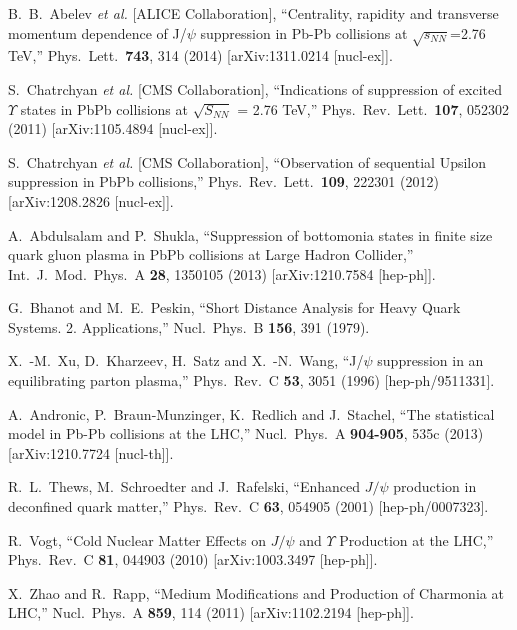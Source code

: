 \documentclass[aps,prc,preprint,superscriptaddress,showpacs,showkeys]{revtex4-1}
\begin{document}
\begin{thebibliography}{100}
  B.~B.~Abelev {\it et al.}  [ALICE Collaboration],
  ``Centrality, rapidity and transverse momentum dependence of J/$\psi$ suppression in Pb-Pb collisions at $\sqrt{s_{NN}}$=2.76 TeV,''
  Phys.\ Lett.\  {\bf 743}, 314 (2014)
  [arXiv:1311.0214 [nucl-ex]].

  S.~Chatrchyan {\it et al.}  [CMS Collaboration],
  ``Indications of suppression of excited $\Upsilon$ states in PbPb collisions at $\sqrt{S_{NN}}$ = 2.76 TeV,''
  Phys.\ Rev.\ Lett.\  {\bf 107}, 052302 (2011)
  [arXiv:1105.4894 [nucl-ex]].

  S.~Chatrchyan {\it et al.}  [CMS Collaboration],
  ``Observation of sequential Upsilon suppression in PbPb collisions,''
  Phys.\ Rev.\ Lett.\  {\bf 109}, 222301 (2012)
  [arXiv:1208.2826 [nucl-ex]].

  A.~Abdulsalam and P.~Shukla,
  ``Suppression of bottomonia states in finite size quark gluon plasma in PbPb collisions at Large Hadron Collider,''
  Int.\ J.\ Mod.\ Phys.\ A {\bf 28}, 1350105 (2013)
  [arXiv:1210.7584 [hep-ph]].

  G.~Bhanot and M.~E.~Peskin,
  ``Short Distance Analysis for Heavy Quark Systems. 2. Applications,''
  Nucl.\ Phys.\ B {\bf 156}, 391 (1979).

  X.~-M.~Xu, D.~Kharzeev, H.~Satz and X.~-N.~Wang,
  ``J/$\psi$ suppression in an equilibrating parton plasma,''
  Phys.\ Rev.\ C {\bf 53}, 3051 (1996)
  [hep-ph/9511331].

  A.~Andronic, P.~Braun-Munzinger, K.~Redlich and J.~Stachel,
  ``The statistical model in Pb-Pb collisions at the LHC,''
  Nucl.\ Phys.\ A {\bf 904-905}, 535c (2013)
  [arXiv:1210.7724 [nucl-th]].

  R.~L.~Thews, M.~Schroedter and J.~Rafelski,
  ``Enhanced $J/\psi$ production in deconfined quark matter,''
  Phys.\ Rev.\ C {\bf 63}, 054905 (2001)
  [hep-ph/0007323].

  R.~Vogt,
  ``Cold Nuclear Matter Effects on $J/\psi$ and $\Upsilon$ Production at the LHC,''
  Phys.\ Rev.\ C {\bf 81}, 044903 (2010)
  [arXiv:1003.3497 [hep-ph]].

  X.~Zhao and R.~Rapp,
  ``Medium Modifications and Production of Charmonia at LHC,''
  Nucl.\ Phys.\ A {\bf 859}, 114 (2011)
  [arXiv:1102.2194 [hep-ph]].


\end{thebibliography}
\end{document}
